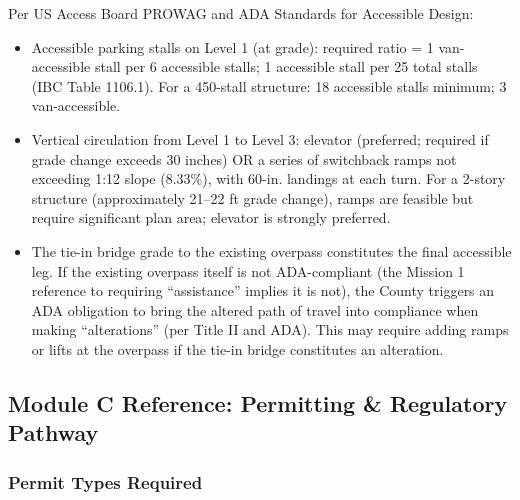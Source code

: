 \documentclass[11pt,letterpaper]{article}
\begin{document}
Per US Access Board PROWAG and ADA Standards for Accessible Design:
\begin{itemize}
  \item Accessible parking stalls on Level 1 (at grade): required ratio = 1 van-accessible stall per 6 accessible stalls; 1 accessible stall per 25 total stalls (IBC Table 1106.1). For a 450-stall structure: 18 accessible stalls minimum; 3 van-accessible.
  \item Vertical circulation from Level 1 to Level 3: elevator (preferred; required if grade change exceeds 30 inches) OR a series of switchback ramps not exceeding 1:12 slope (8.33\%), with 60-in. landings at each turn. For a 2-story structure (approximately 21--22 ft grade change), ramps are feasible but require significant plan area; elevator is strongly preferred.
  \item The tie-in bridge grade to the existing overpass constitutes the final accessible leg. If the existing overpass itself is not ADA-compliant (the Mission 1 reference to requiring ``assistance'' implies it is not), the County triggers an ADA obligation to bring the altered path of travel into compliance when making ``alterations'' (per Title II and ADA). This may require adding ramps or lifts at the overpass if the tie-in bridge constitutes an alteration.
\end{itemize}

\subsection{Module C Reference: Permitting \& Regulatory Pathway}

\subsubsection{Permit Types Required}
\end{document}
